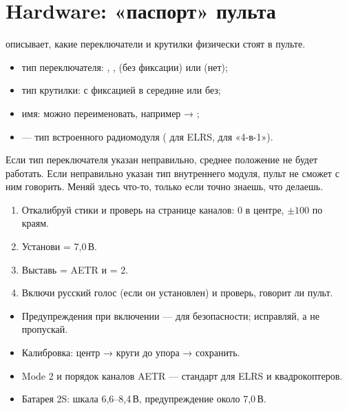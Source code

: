\section{Hardware: «паспорт» пульта}

 описывает, какие переключатели и крутилки физически стоят в пульте.

\begin{center}
\end{center}

\begin{itemize}
  \item тип переключателя: , ,  (без фиксации) или
         (нет);
  \item тип крутилки: с фиксацией в середине или без;
  \item имя: можно переименовать, например  → ;
  \item {} --- тип встроенного радиомодуля ( для ELRS,
         для «4-в-1»).
\end{itemize}

\begin{caution}
Если тип переключателя указан неправильно, среднее положение не будет работать. Если
неправильно указан тип внутреннего модуля, пульт не сможет с ним говорить. Меняй здесь
что-то, только если точно знаешь, что делаешь.
\end{caution}

\begin{tryit}
\begin{enumerate}
  \item Откалибруй стики и проверь на странице каналов: 0 в центре, $\pm100$ по краям.
  \item Установи  = 7,0\,В.
  \item Выставь  = AETR и  = 2.
  \item Включи русский голос (если он установлен) и проверь, говорит ли пульт.
\end{enumerate}
\end{tryit}

\begin{summary}
\begin{itemize}
  \item Предупреждения при включении --- для безопасности; исправляй, а не пропускай.
  \item Калибровка: центр → круги до упора → сохранить.
  \item Mode 2 и порядок каналов AETR --- стандарт для ELRS и квадрокоптеров.
  \item Батарея 2S: шкала 6,6--8,4\,В, предупреждение около 7,0\,В.
\end{itemize}
\end{summary}

